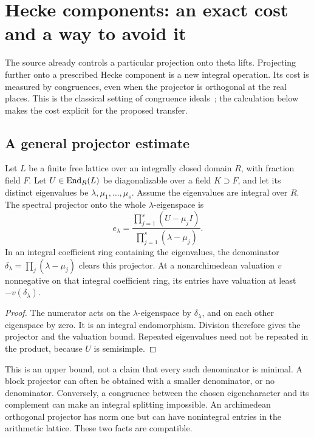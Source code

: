 \section{Hecke components: an exact cost and a way to avoid it}
\label{sec:hecke}

The source already controls a particular projection onto theta lifts.
Projecting further onto a prescribed Hecke component is a new integral
operation. Its cost is measured by congruences, even when the projector is
orthogonal at the real places. This is the classical setting of congruence
ideals~\cite{hida,ars}; the calculation below makes the cost explicit for
the proposed transfer.

\subsection{A general projector estimate}

\begin{proposition}
Let $L$ be a finite free lattice over an integrally closed domain $R$, with
fraction field $F$. Let $U\in\operatorname{End}_R(L)$ be diagonalizable over a field
$K\supset F$, and let its distinct eigenvalues be
$\lambda,\mu_1,\ldots,\mu_s$. Assume the eigenvalues are integral over $R$.
The spectral projector onto the whole $\lambda$-eigenspace is
\[
 e_\lambda=\frac{\prod_{j=1}^s(U-\mu_j I)}
                    {\prod_{j=1}^s(\lambda-\mu_j)}.
\]
In an integral coefficient ring containing the eigenvalues, the denominator
$\delta_\lambda=\prod_j(\lambda-\mu_j)$ clears this projector. At a
nonarchimedean valuation $v$ nonnegative on that integral coefficient ring,
its entries have valuation at least
$-v(\delta_\lambda)$.
\end{proposition}
\begin{proof}
The numerator acts on the $\lambda$-eigenspace by $\delta_\lambda$, and on
each other eigenspace by zero. It is an integral endomorphism. Division
therefore gives the projector and the valuation bound. Repeated
eigenvalues need not be repeated in the product, because $U$ is semisimple.
\end{proof}

This is an upper bound, not a claim that every such denominator is minimal.
A block projector can often be obtained with a smaller denominator, or no
denominator. Conversely, a congruence between the chosen eigencharacter and
its complement can make an integral splitting impossible. An archimedean
orthogonal projector has norm one but can have nonintegral entries in the
arithmetic lattice. These two facts are compatible.

